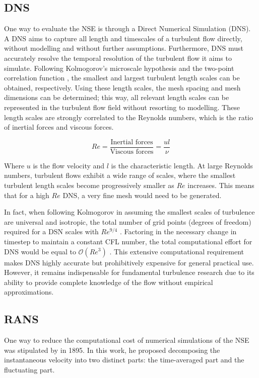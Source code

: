 \subsection{DNS}
One way to evaluate the NSE is through a Direct Numerical Simulation (DNS). A DNS aims to capture all length and timescales of a turbulent flow directly, without modelling and without further assumptions. Furthermore, DNS must accurately resolve the temporal resolution of the turbulent flow it aims to simulate. Following Kolmogorov's microscale hypothesis \cite{Kolmogorov1941} and the two-point correlation function \cite{Pope2000}, the smallest and largest turbulent length scales can be obtained, respectively. Using these length scales, the mesh spacing and mesh dimensions can be determined; this way, all relevant length scales can be represented in the turbulent flow field without resorting to modelling. These length scales are strongly correlated to the Reynolds numbers, which is the ratio of inertial forces and viscous forces. 

\begin{equation}\label{eq: Reynoldsnr}
    Re = \frac{\text{Inertial forces}}{\text{Viscous forces}}= \frac{u l}{\nu}
\end{equation}

Where $u$ is the flow velocity and $l$ is the characteristic length. At large Reynolds numbers, turbulent flows exhibit a wide range of scales, where the smallest turbulent length scales become progressively smaller as $Re$ increases. This means that for a high $Re$ DNS, a very fine mesh would need to be generated. 

In fact, when following Kolmogorov in assuming the smallest scales of turbulence are universal and isotropic, the total number of grid points (degrees of freedom) required for a DSN scales with $Re^{9/4}$ \cite{Coleman2010}. Factoring in the necessary change in timestep to maintain a constant CFL number, the total computational effort for DNS would be equal to $\mathcal{O}(Re^3)$ \cite{Coleman2010}. This extensive computational requirement makes DNS highly accurate but prohibitively expensive for general practical use. However, it remains indispensable for fundamental turbulence research due to its ability to provide complete knowledge of the flow without empirical approximations.


\subsection{RANS}
One way to reduce the computational cost of numerical simulations of the NSE was stipulated by \textcite{Reynolds1895} in 1895. In this work, he proposed decomposing the instantaneous velocity into two distinct parts: the time-averaged part and the fluctuating part. 

